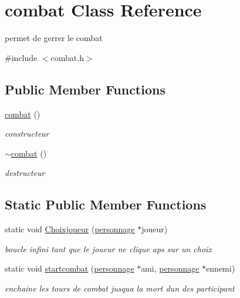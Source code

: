 \hypertarget{classcombat}{}\section{combat Class Reference}
\label{classcombat}


permet de gerrer le combat  




{\ttfamily \#include $<$combat.\+h$>$}

\subsection*{Public Member Functions}
\begin{DoxyCompactItemize}
\item 
\mbox{\hyperlink{classcombat_a24684829bb4a17a24b2716f7ebdc7da1}{combat}} ()
\begin{DoxyCompactList}\small\item\em constructeur \end{DoxyCompactList}\item 
\mbox{\hyperlink{classcombat_ad44642fc2a369d60b7cb8f8bcd7b86ed}{$\sim$combat}} ()
\begin{DoxyCompactList}\small\item\em destructeur \end{DoxyCompactList}\end{DoxyCompactItemize}
\subsection*{Static Public Member Functions}
\begin{DoxyCompactItemize}
\item 
static void \mbox{\hyperlink{classcombat_afcad4d1096487266fdf07ffd14eb684d}{Choixjoueur}} (\mbox{\hyperlink{classpersonnage}{personnage}} $\ast$joueur)
\begin{DoxyCompactList}\small\item\em boucle infini tant que le joueur ne clique aps sur un choix \end{DoxyCompactList}\item 
static void \mbox{\hyperlink{classcombat_a0d35d19c972a74a3ba97192ab10d2df1}{startcombat}} (\mbox{\hyperlink{classpersonnage}{personnage}} $\ast$ami, \mbox{\hyperlink{classpersonnage}{personnage}} $\ast$ennemi)
\begin{DoxyCompactList}\small\item\em enchaine les tours de combat jusqu\textquotesingle{}a la mort d\textquotesingle{}un des participant \end{DoxyCompactList}\end{DoxyCompactItemize}
